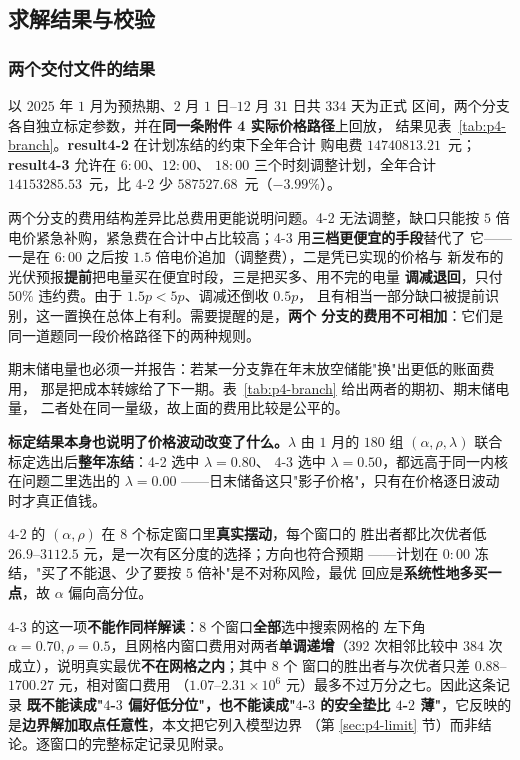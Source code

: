 \subsection{求解结果与校验}
\label{sec:p4-result}

\subsubsection{两个交付文件的结果}

以 $2025$ 年 $1$ 月为预热期、$2$ 月 $1$ 日--$12$ 月 $31$ 日共 $334$ 天为正式
区间，两个分支各自独立标定参数，并在\textbf{同一条附件 4 实际价格路径}上回放，
结果见表~\ref{tab:p4-branch}。\textbf{result4-2} 在计划冻结的约束下全年合计
购电费 $14740813.21$~元；\textbf{result4-3} 允许在 $6{:}00$、$12{:}00$、
$18{:}00$ 三个时刻调整计划，全年合计 $14153285.53$~元，比 4-2 少
$587527.68$~元（$-3.99\%$）。

两个分支的费用结构差异比总费用更能说明问题。4-2 无法调整，缺口只能按 $5$ 倍
电价紧急补购，紧急费在合计中占比较高；4-3 用\textbf{三档更便宜的手段}替代了
它——一是在 $6{:}00$ 之后按 $1.5$ 倍电价追加（调整费），二是凭已实现的价格与
新发布的光伏预报\textbf{提前}把电量买在便宜时段，三是把买多、用不完的电量
\textbf{调减退回}，只付 $50\%$ 违约费。由于 $1.5p<5p$、调减还倒收 $0.5p$，
且有相当一部分缺口被提前识别，这一置换在总体上有利。需要提醒的是，\textbf{两个
分支的费用不可相加}：它们是同一道题同一段价格路径下的两种规则。

期末储电量也必须一并报告：若某一分支靠在年末放空储能"换"出更低的账面费用，
那是把成本转嫁给了下一期。表~\ref{tab:p4-branch} 给出两者的期初、期末储电量，
二者处在同一量级，故上面的费用比较是公平的。

\textbf{标定结果本身也说明了价格波动改变了什么。}$\lambda$ 由 $1$ 月的 $180$ 组
$(\alpha,\rho,\lambda)$ 联合标定选出后\textbf{整年冻结}：4-2 选中 $\lambda=0.80$、
4-3 选中 $\lambda=0.50$，都远高于同一内核在问题二里选出的 $\lambda=0.00$
——日末储备这只"影子价格"，只有在价格逐日波动时才真正值钱。

$4$-$2$ 的 $(\alpha,\rho)$ 在 $8$ 个标定窗口里\textbf{真实摆动}，每个窗口的
胜出者都比次优者低 $26.9$--$3112.5$ 元，是一次有区分度的选择；方向也符合预期
——计划在 $0{:}00$ 冻结，"买了不能退、少了要按 $5$ 倍补"是不对称风险，最优
回应是\textbf{系统性地多买一点}，故 $\alpha$ 偏向高分位。

$4$-$3$ 的这一项\textbf{不能作同样解读}：$8$ 个窗口\textbf{全部}选中搜索网格的
左下角 $\alpha=0.70,\rho=0.5$，且网格内窗口费用对两者\textbf{单调递增}（$392$
次相邻比较中 $384$ 次成立），说明真实最优\textbf{不在网格之内}；其中 $8$ 个
窗口的胜出者与次优者只差 $0.88$--$1700.27$ 元，相对窗口费用
（$1.07$--$2.31\times10^{6}$ 元）最多不过万分之七。因此这条记录
\textbf{既不能读成"$4$-$3$ 偏好低分位"，也不能读成"$4$-$3$ 的安全垫比
$4$-$2$ 薄"}，它反映的是\textbf{边界解加取点任意性}，本文把它列入模型边界
（第 \ref{sec:p4-limit} 节）而非结论。逐窗口的完整标定记录见附录。

